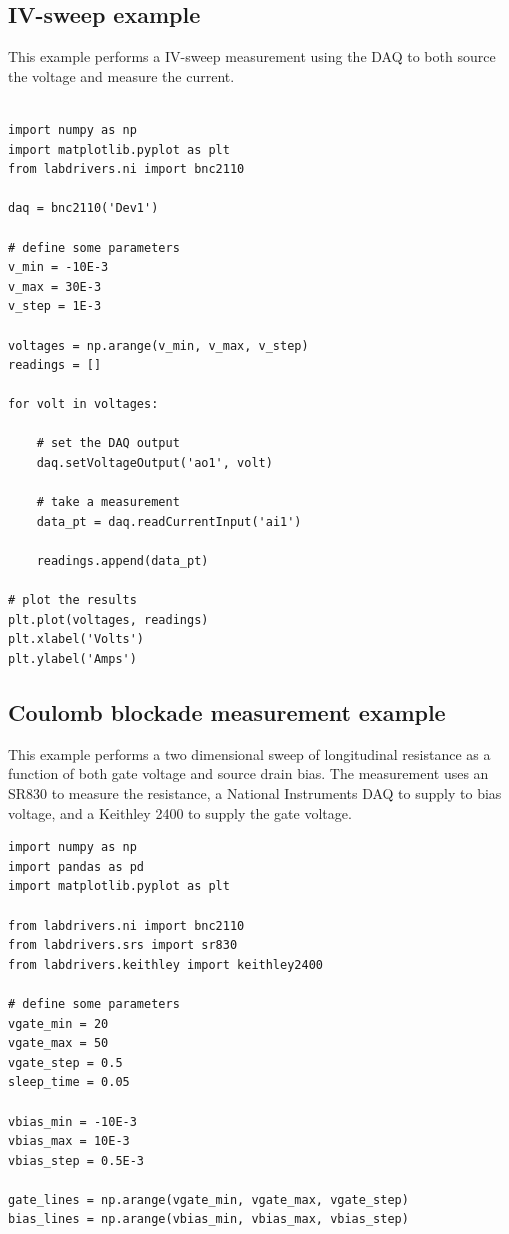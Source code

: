 \documentclass[edeposit,fullpage,draftthesis]{uiucthesis2009}
\begin{document}
\begin{appendices}
\subsection{IV-sweep example}

This example performs a IV-sweep measurement using the DAQ to both source the voltage and measure the current.
\begin{verbatim}
    
import numpy as np
import matplotlib.pyplot as plt
from labdrivers.ni import bnc2110

daq = bnc2110('Dev1')

# define some parameters
v_min = -10E-3
v_max = 30E-3
v_step = 1E-3

voltages = np.arange(v_min, v_max, v_step)
readings = []

for volt in voltages:

    # set the DAQ output
    daq.setVoltageOutput('ao1', volt)
    
    # take a measurement
    data_pt = daq.readCurrentInput('ai1')
    
    readings.append(data_pt)
    
# plot the results
plt.plot(voltages, readings)
plt.xlabel('Volts')
plt.ylabel('Amps')

\end{verbatim}

\subsection{Coulomb blockade measurement example}

This example performs a two dimensional sweep of longitudinal resistance as a function
of both gate voltage and source drain bias. The measurement uses an SR830 to measure
the resistance, a National Instruments DAQ to supply to bias voltage, and a Keithley 2400
to supply the gate voltage.
\begin{verbatim}
import numpy as np
import pandas as pd
import matplotlib.pyplot as plt

from labdrivers.ni import bnc2110
from labdrivers.srs import sr830
from labdrivers.keithley import keithley2400

# define some parameters
vgate_min = 20
vgate_max = 50
vgate_step = 0.5
sleep_time = 0.05

vbias_min = -10E-3
vbias_max = 10E-3
vbias_step = 0.5E-3

gate_lines = np.arange(vgate_min, vgate_max, vgate_step)
bias_lines = np.arange(vbias_min, vbias_max, vbias_step)


\end{verbatim}
\end{appendices}
\end{document}

